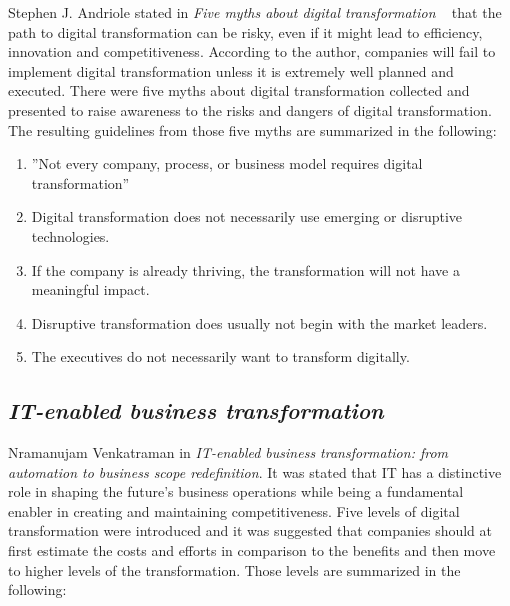 \documentclass[a4]{scrartcl}
\begin{document}
	Stephen J. Andriole stated in \textit{Five myths about digital transformation }~\cite{5myths} that the path to digital transformation can be risky, even if it might lead to efficiency, innovation and competitiveness.
	According to the author, companies will fail to implement digital transformation unless it is extremely well planned and executed. There were five myths about digital transformation collected and presented to raise awareness to the risks and dangers of digital transformation. The resulting guidelines from those five myths are summarized in the following:
	\begin{enumerate}
		\item ''Not every company, process, or business model requires digital transformation''~\cite[p. 20]{5myths}
		\item Digital transformation does not necessarily use emerging or disruptive technologies.
		\item If the company is already thriving, the transformation will not have a meaningful impact.
		\item Disruptive transformation does usually not begin with the market leaders.
		\item The executives do not necessarily want to transform digitally.
	\end{enumerate}
	
	










\subsection{\textit{IT-enabled business transformation}} \label{venkat}	

Nramanujam Venkatraman in \textit{IT-enabled business transformation: from automation to business scope redefinition}. \cite{venkat}
It was stated that IT has a distinctive role in shaping the future's business operations while being a fundamental enabler in creating and maintaining competitiveness.
Five levels of digital transformation were introduced and it was suggested that companies should at first estimate the costs and efforts in comparison to the benefits and then move to higher levels of the transformation. Those levels are summarized in the following:
\end{document}
